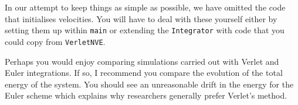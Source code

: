 In our attempt to keep things as simple as possible, we have omitted the code 
that initialises velocities. You will have to deal with these yourself either by 
setting them up within \texttt{main} or extending the \texttt{Integrator} with 
code that you could copy from \texttt{VerletNVE}.

Perhaps you would enjoy comparing simulations carried out with Verlet and Euler 
integrations. If so, I recommend you compare the evolution of the total energy 
of the system. You should see an unreasonable drift in the energy for the Euler 
scheme which explains why researchers generally prefer Verlet's method.

